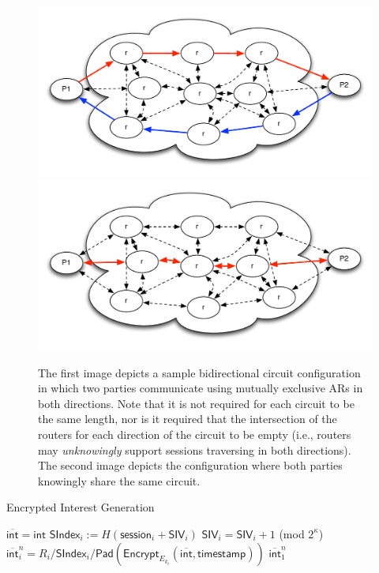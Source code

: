 \documentclass[10pt]{article}
\begin{document}
\begin{figure}[ht!]
\begin{center}
\includegraphics[scale=0.5]{./images/pool.pdf}
\includegraphics[scale=0.5]{./images/pool_same.pdf}
\end{center}
\caption{The first image depicts a sample bidirectional circuit configuration in which two parties communicate using mutually exclusive ARs in both directions. Note that it is not required for each circuit to be the same length, nor is it required that the intersection of the routers for each direction of the circuit to be empty (i.e., routers may \emph{unknowingly} support sessions traversing in both directions). The second image depicts the configuration where both parties knowingly share the same circuit.}
\label{fig:pool}
\end{figure}

\begin{algorithm}[ht!]
  \caption{Encrypted Interest Generation}
  \begin{algorithmic}[1]
\State $\overline{\mathsf{int}} = \mathsf{int}$
  \State $\mathsf{SIndex}_i := H(\mathsf{session}_i + \mathsf{SIV}_i)$
  \State $\mathsf{SIV}_i = \mathsf{SIV}_i + 1$ (mod $2^{\kappa}$)
  \State $\overline{\mathsf{int}}_i^n = R_i / \mathsf{SIndex}_i / \mathsf{Pad}(\mathsf{Encrypt}_{E_{k_i}}(\overline{\mathsf{int}}, \mathsf{timestamp}))$
\EndFor
\State \Return $\overline{\mathsf{int}}_1^n$
\end{algorithmic}
\label{alg:enc_int_gen}
\end{algorithm}
\end{document}
